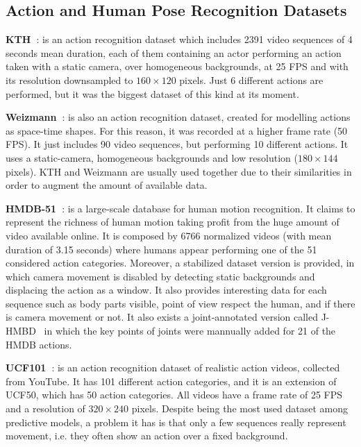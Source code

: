\subsection{Action and Human Pose Recognition Datasets}
\vspace*{0.1cm}\noindent\textbf{KTH~\cite{Schuldt2004}}: is an action recognition dataset which includes \num{2391} video sequences of \num{4} seconds mean duration, each of them containing an actor performing an action taken with a static camera, over homogeneous backgrounds, at \num{25} \ac{FPS} and with its resolution downsampled to $160 \times 120$ pixels. Just \num{6} different actions are performed, but it was the biggest dataset of this kind at its moment.

\vspace*{0.1cm}\noindent\textbf{Weizmann~\cite{Gorelick2007}}: is also an action recognition dataset, created for modelling actions as space-time shapes. For this reason, it was recorded at a higher frame rate (\num{50} \ac{FPS}). It just includes \num{90} video sequences, but performing 10 different actions. It uses a static-camera, homogeneous backgrounds and low resolution ($180 \times 144$ pixels). KTH and Weizmann are usually used together due to their similarities in order to augment the amount of available data.

\vspace*{0.1cm}\noindent\textbf{HMDB-51~\cite{Kuehne2011}}: is a large-scale database for human motion recognition. It claims to represent the richness of human motion taking profit from the huge amount of video available online. It is composed by \num{6766} normalized videos (with mean duration of \num{3.15} seconds) where humans appear performing one of the 51 considered action categories. Moreover, a stabilized dataset version is provided, in which camera movement is disabled by detecting static backgrounds and displacing the action as a window. It also provides interesting data for each sequence such as body parts visible, point of view respect the human, and if there is camera movement or not. It also exists a joint-annotated version called J-HMBD~\cite{Jhuang2013} in which the key points of joints were mannually added for 21 of the HMDB actions.

\vspace*{0.1cm}\noindent\textbf{UCF101~\cite{Soomro2012}}: is an action recognition dataset of realistic action videos, collected from YouTube. It has 101 different action categories, and it is an extension of UCF50, which has \num{50} action categories. All videos have a frame rate of 25 \ac{FPS} and a resolution of $320 \times 240$ pixels. Despite being the most used dataset among predictive models, a problem it has is that only a few sequences really represent movement, i.e. they often show an action over a fixed background.

